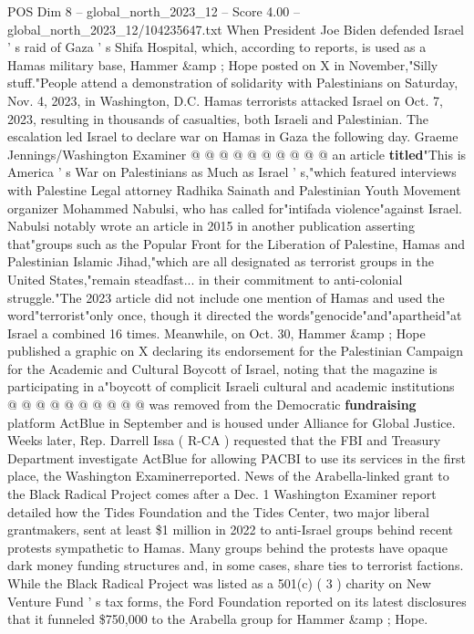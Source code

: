 \begin{textsample}{POS Dim 8 – global\_north\_2023\_12 – Score 4.00 – global\_north\_2023\_12/104235647.txt}
When President Joe Biden defended Israel ' s raid of Gaza ' s Shifa Hospital, which, according to reports, is used as a Hamas military base, Hammer \&amp ; Hope posted on X in November,"Silly stuff."People attend a demonstration of solidarity with Palestinians on Saturday, Nov. 4, 2023, in Washington, D.C.
Hamas terrorists attacked Israel on Oct. 7, 2023, resulting in thousands of casualties, both Israeli and Palestinian.
The escalation led Israel to declare war on Hamas in Gaza the following day.
Graeme Jennings/Washington Examiner @ @ @ @ @ @ @ @ @ @ an article \textbf{titled}"This is America ' s War on Palestinians as Much as Israel ' s,"which featured interviews with Palestine Legal attorney Radhika Sainath and Palestinian Youth Movement organizer Mohammed Nabulsi, who has called for"intifada violence"against Israel.
Nabulsi notably wrote an article in 2015 in another publication asserting that"groups such as the Popular Front for the Liberation of Palestine, Hamas and Palestinian Islamic Jihad,"which are all designated as terrorist groups in the United States,"remain steadfast... in their commitment to anti-colonial struggle."The 2023 article did not include one mention of Hamas and used the word"terrorist"only once, though it directed the words"genocide"and"apartheid"at Israel a combined 16 times.
Meanwhile, on Oct. 30, Hammer \&amp ; Hope published a graphic on X declaring its endorsement for the Palestinian Campaign for the Academic and Cultural Boycott of Israel, noting that the magazine is participating in a"boycott of complicit Israeli cultural and academic institutions @ @ @ @ @ @ @ @ @ @ was removed from the Democratic \textbf{fundraising} platform ActBlue in September and is housed under Alliance for Global Justice.
Weeks later, Rep.
Darrell Issa ( R-CA ) requested that the FBI and Treasury Department investigate ActBlue for allowing PACBI to use its services in the first place, the Washington Examinerreported.
News of the Arabella-linked grant to the Black Radical Project comes after a Dec. 1 Washington Examiner report detailed how the Tides Foundation and the Tides Center, two major liberal grantmakers, sent at least \$1 million in 2022 to anti-Israel groups behind recent protests sympathetic to Hamas.
Many groups behind the protests have opaque dark money funding structures and, in some cases, share ties to terrorist factions.
While the Black Radical Project was listed as a 501(c) ( 3 ) charity on New Venture Fund ' s tax forms, the Ford Foundation reported on its latest disclosures that it funneled \$750,000 to the Arabella group for Hammer \&amp ; Hope.

\end{textsample}
